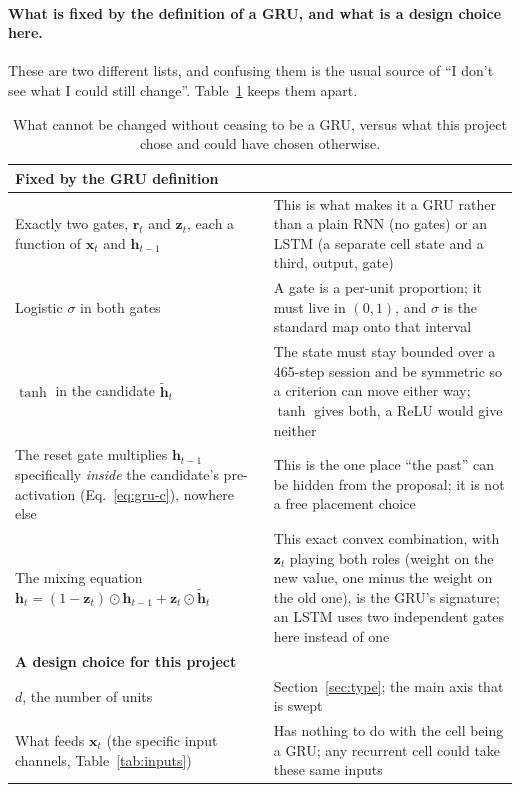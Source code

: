 \documentclass[11pt,a4paper]{article}
\newcommand{\vect}[1]{\bm{#1}}
\begin{document}
\paragraph{What is fixed by the definition of a GRU, and what is a design choice here.}
These are two different lists, and confusing them is the usual source of ``I don't see
what I could still change''. Table~\ref{tab:gru-fixed} keeps them apart.

\begin{table}[H]
  \centering\small
  \caption{What cannot be changed without ceasing to be a GRU, versus what this project
  chose and could have chosen otherwise.}
  \label{tab:gru-fixed}
  \begin{tabular}{p{6.3cm}p{8.5cm}}
    \toprule
    \textbf{Fixed by the GRU definition} & \\
    \midrule
    Exactly two gates, $\vect{r}_t$ and $\vect{z}_t$, each a function of $\vect{x}_t$ and $\vect{h}_{t-1}$ &
      This is what makes it a GRU rather than a plain RNN (no gates) or an LSTM (a separate cell state and a third, output, gate) \\
    Logistic $\sigma$ in both gates &
      A gate is a per-unit proportion; it must live in $(0,1)$, and $\sigma$ is the standard map onto that interval \\
    $\tanh$ in the candidate $\tilde{\vect{h}}_t$ &
      The state must stay bounded over a 465-step session and be symmetric so a criterion can move either way; $\tanh$ gives both, a ReLU would give neither \\
    The reset gate multiplies $\vect{h}_{t-1}$ specifically \emph{inside} the candidate's pre-activation (Eq.~\ref{eq:gru-c}), nowhere else &
      This is the one place ``the past'' can be hidden from the proposal; it is not a free placement choice \\
    The mixing equation $\vect{h}_t = (1-\vect{z}_t)\odot\vect{h}_{t-1} + \vect{z}_t\odot\tilde{\vect{h}}_t$ &
      This exact convex combination, with $\vect{z}_t$ playing both roles (weight on the new value, one minus the weight on the old one), is the GRU's signature; an LSTM uses two independent gates here instead of one \\
    \midrule
    \textbf{A design choice for this project} & \\
    \midrule
    $d$, the number of units & Section~\ref{sec:type}; the main axis that is swept \\
    What feeds $\vect{x}_t$ (the specific input channels, Table~\ref{tab:inputs}) &
      Has nothing to do with the cell being a GRU; any recurrent cell could take these same inputs \\

\end{tabular}
\end{table}
\end{document}
